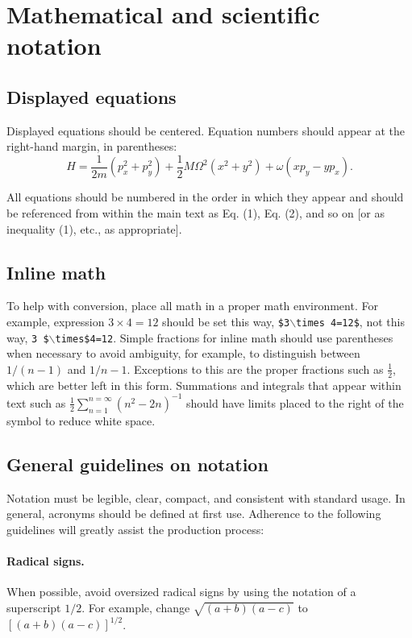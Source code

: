 \documentclass[10pt,letterpaper]{article}
\begin{document}
\section{Mathematical and scientific notation}

\subsection{Displayed equations} Displayed equations should be centered.
Equation numbers should appear at the right-hand margin, in
parentheses:
\begin{equation}
H = \frac{1}{2m}(p_x^2 + p_y^2) + \frac{1}{2} M{\Omega}^2
     (x^2 + y^2) + \omega (x p_y - y p_x).
\end{equation}

All equations should be numbered in the order in which they appear
and should be referenced  from within the main text as Eq. (1),
Eq. (2), and so on [or as inequality (1), etc., as appropriate].

\subsection{Inline math} To help with conversion, place all math in a proper math environment. For example, expression \mbox{$3\times 4 = 12$} should be set this way, \texttt{\$3$\backslash$times 4=12\$}, not this way, \texttt{3 \$$\backslash$times\$4=12}. Simple fractions for inline math
should use parentheses when necessary to avoid ambiguity, for
example, to distinguish between $1/(n-1)$ and $1/n-1$.  Exceptions
to this are the proper fractions such as $\frac{1}{2}$, which are
better left in this form. Summations and integrals that appear
within text such as $\frac{1}{2}{\sum }_{n=1}^{n=\infty} (n^2 -
2n)^{-1}$ should have limits placed to the right of the symbol to
reduce white space.

\subsection{General guidelines on notation} Notation must be
legible, clear, compact, and consistent with standard usage. In
general, acronyms should be defined at first use. Adherence to the
following guidelines will greatly assist the production process:

\paragraph*{\bf Radical signs.}
When possible, avoid oversized radical signs
by using the notation of a superscript $1/2$. For example, change
$\sqrt{(a + b)(a - c)}$ to $[(a + b)(a - c)]^{1/2}$.
\end{document}
